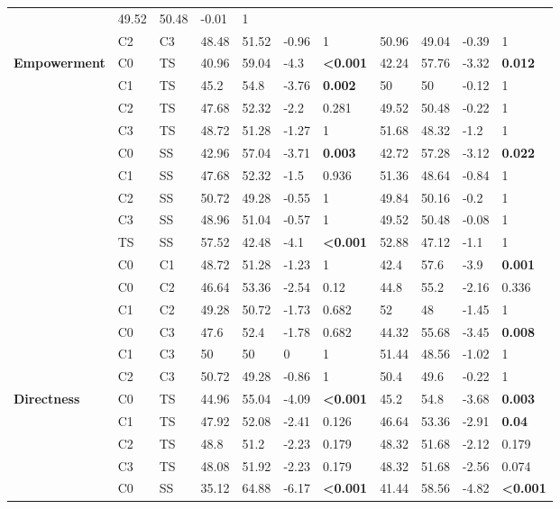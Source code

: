 \begin{table}[htp]
\begin{tabular}{l l l l l l l l l l l}
& 49.52 & 50.48 & -0.01 & 1
\\
 & C2 & C3 & 48.48 & 51.52 & -0.96 & 1
& 50.96 & 49.04 & -0.39 & 1
\\
 \hline
\multirow{15}{*}{\textbf{Empowerment}} & C0 & TS & 40.96 & 59.04 & -4.3 & \textbf{\textless0.001}
& 42.24 & 57.76 & -3.32 & \textbf{0.012}
\\
 & C1 & TS & 45.2 & 54.8 & -3.76 & \textbf{0.002}
& 50 & 50 & -0.12 & 1
\\
 & C2 & TS & 47.68 & 52.32 & -2.2 & 0.281
& 49.52 & 50.48 & -0.22 & 1
\\
 & C3 & TS & 48.72 & 51.28 & -1.27 & 1
& 51.68 & 48.32 & -1.2 & 1
\\
 & C0 & SS & 42.96 & 57.04 & -3.71 & \textbf{0.003}
& 42.72 & 57.28 & -3.12 & \textbf{0.022}
\\
 & C1 & SS & 47.68 & 52.32 & -1.5 & 0.936
& 51.36 & 48.64 & -0.84 & 1
\\
 & C2 & SS & 50.72 & 49.28 & -0.55 & 1
& 49.84 & 50.16 & -0.2 & 1
\\
 & C3 & SS & 48.96 & 51.04 & -0.57 & 1
& 49.52 & 50.48 & -0.08 & 1
\\
 & TS & SS & 57.52 & 42.48 & -4.1 &\textbf{ \textless0.001}
& 52.88 & 47.12 & -1.1 & 1
\\
 & C0 & C1 & 48.72 & 51.28 & -1.23 & 1
& 42.4 & 57.6 & -3.9 & \textbf{0.001}
\\
 & C0 & C2 & 46.64 & 53.36 & -2.54 & 0.12
& 44.8 & 55.2 & -2.16 & 0.336
\\
 & C1 & C2 & 49.28 & 50.72 & -1.73 & 0.682
& 52 & 48 & -1.45 & 1
\\
 & C0 & C3 & 47.6 & 52.4 & -1.78 & 0.682
& 44.32 & 55.68 & -3.45 & \textbf{0.008}
\\
 & C1 & C3 & 50 & 50 & 0 & 1
& 51.44 & 48.56 & -1.02 & 1
\\
 & C2 & C3 & 50.72 & 49.28 & -0.86 & 1
& 50.4 & 49.6 & -0.22 & 1
\\
 \hline
\multirow{15}{*}{\textbf{Directness}} & C0 & TS & 44.96 & 55.04 & -4.09 & \textbf{\textless0.001}
& 45.2 & 54.8 & -3.68 & \textbf{0.003}
\\
 & C1 & TS & 47.92 & 52.08 & -2.41 & 0.126
& 46.64 & 53.36 & -2.91 & \textbf{0.04}
\\
 & C2 & TS & 48.8 & 51.2 & -2.23 & 0.179
& 48.32 & 51.68 & -2.12 & 0.179
\\
 & C3 & TS & 48.08 & 51.92 & -2.23 & 0.179
& 48.32 & 51.68 & -2.56 & 0.074
\\
 & C0 & SS & 35.12 & 64.88 & -6.17 &\textbf{ \textless0.001}
& 41.44 & 58.56 & -4.82 & \textbf{\textless0.001}

\end{tabular}
\end{table}
